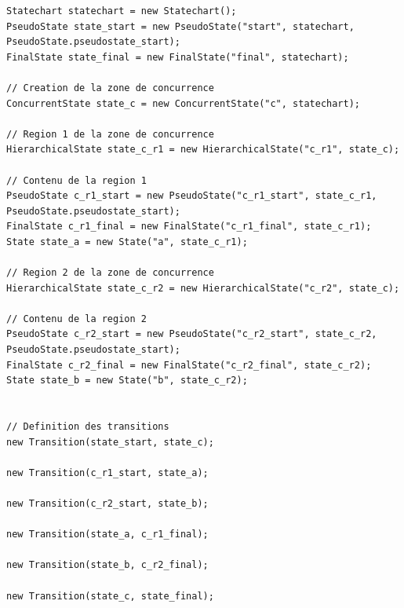 \documentclass[french, 12pt, a4paper]{article}
\begin{document}
	    \begin{lstlisting}[basicstyle=\small]
Statechart statechart = new Statechart();
PseudoState state_start = new PseudoState("start", statechart, PseudoState.pseudostate_start);
FinalState state_final = new FinalState("final", statechart);

// Creation de la zone de concurrence
ConcurrentState state_c = new ConcurrentState("c", statechart);

// Region 1 de la zone de concurrence
HierarchicalState state_c_r1 = new HierarchicalState("c_r1", state_c);

// Contenu de la region 1
PseudoState c_r1_start = new PseudoState("c_r1_start", state_c_r1, PseudoState.pseudostate_start);
FinalState c_r1_final = new FinalState("c_r1_final", state_c_r1);
State state_a = new State("a", state_c_r1);

// Region 2 de la zone de concurrence
HierarchicalState state_c_r2 = new HierarchicalState("c_r2", state_c);

// Contenu de la region 2
PseudoState c_r2_start = new PseudoState("c_r2_start", state_c_r2, PseudoState.pseudostate_start);
FinalState c_r2_final = new FinalState("c_r2_final", state_c_r2);
State state_b = new State("b", state_c_r2);


// Definition des transitions
new Transition(state_start, state_c);

new Transition(c_r1_start, state_a);

new Transition(c_r2_start, state_b);

new Transition(state_a, c_r1_final);

new Transition(state_b, c_r2_final);

new Transition(state_c, state_final);

        \end{lstlisting}
\end{document}
